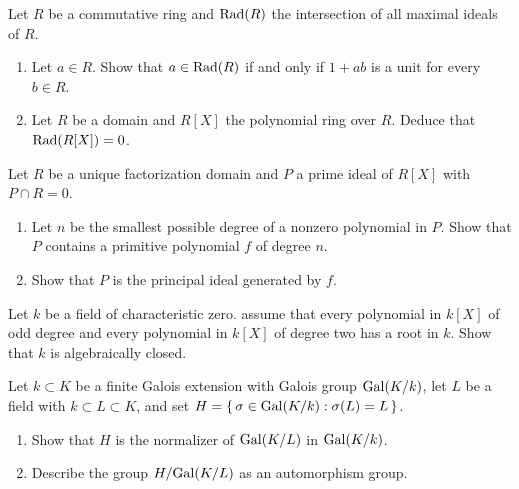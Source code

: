 \begin{problem}
  Let $R$ be a commutative ring and $\operatorname{Rad}(R)$ the intersection of all
  maximal ideals of $R$.
  \begin{enumerate}[label=(\alph*),noitemsep]
  \item Let $a\in R$. Show that $a\in\operatorname{Rad}(R)$ if and only if $1+ab$ is a
    unit for every $b\in R$.
  \item Let $R$ be a domain and $R[X]$ the polynomial ring over
    $R$. Deduce that $\operatorname{Rad}(R[X])=0$.
  \end{enumerate}
\end{problem}
\begin{solution}
\end{solution}

\begin{problem}
  Let $R$ be a unique factorization domain and $P$ a prime ideal of $R[X]$
  with $P\cap R=0$.
  \begin{enumerate}[label=(\alph*),noitemsep]
  \item Let $n$ be the smallest possible degree of a nonzero polynomial in
    $P$. Show that $P$ contains a primitive polynomial $f$ of degree $n$.
  \item Show that $P$ is the principal ideal generated by $f$.
  \end{enumerate}
\end{problem}
\begin{solution}
\end{solution}

\begin{problem}
  Let $k$ be a field of characteristic zero. assume that every polynomial
  in $k[X]$ of odd degree and every polynomial in $k[X]$ of degree two has
  a root in $k$. Show that $k$ is algebraically closed.
\end{problem}
\begin{solution}
\end{solution}

\begin{problem}
  Let $k\subset K$ be a finite Galois extension with Galois group
  $\operatorname{Gal}(K/k)$, let $L$ be a field with $ k\subset L\subset K$, and set
  $H=\left\{\,\sigma\in\operatorname{Gal}(K/k):\sigma(L)=L\,\right\}$.
  \begin{enumerate}[label=(\alph*),noitemsep]
  \item Show that $H$ is the normalizer of $\operatorname{Gal}(K/L)$ in $\operatorname{Gal}(K/k)$.
  \item Describe the group $H/{\operatorname{Gal}(K/L)}$ as an automorphism group.
  \end{enumerate}
\end{problem}
\begin{solution}
\end{solution}

